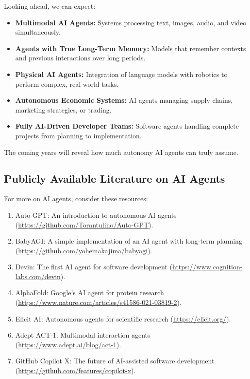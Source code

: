 Looking ahead, we can expect:
\begin{itemize}
  \item \textbf{Multimodal AI Agents:} Systems processing text, images, audio, and video simultaneously.
  \item \textbf{Agents with True Long-Term Memory:} Models that remember contexts and previous
        interactions over long periods.
  \item \textbf{Physical AI Agents:} Integration of language models with robotics to perform complex,
        real-world tasks.
  \item \textbf{Autonomous Economic Systems:} AI agents managing supply chains, marketing strategies,
        or trading.
  \item \textbf{Fully AI-Driven Developer Teams:} Software agents handling complete projects from
        planning to implementation.
\end{itemize}

The coming years will reveal how much autonomy AI agents can truly assume.

\subsection{Publicly Available Literature on AI Agents}

For more on AI agents, consider these resources:
\begin{enumerate}
  \item Auto-GPT: An introduction to autonomous AI agents
        (\url{https://github.com/Torantulino/Auto-GPT}).
  \item BabyAGI: A simple implementation of an AI agent with long-term planning
        (\url{https://github.com/yoheinakajima/babyagi}).
  \item Devin: The first AI agent for software development
        (\url{https://www.cognition-labs.com/devin}).
  \item AlphaFold: Google’s AI agent for protein research
        (\url{https://www.nature.com/articles/s41586-021-03819-2}).
  \item Elicit AI: Autonomous agents for scientific research
        (\url{https://elicit.org/}).
  \item Adept ACT-1: Multimodal interaction agents
        (\url{https://www.adept.ai/blog/act-1}).
  \item GitHub Copilot X: The future of AI-assisted software development
        (\url{https://github.com/features/copilot-x}).
\end{enumerate}

